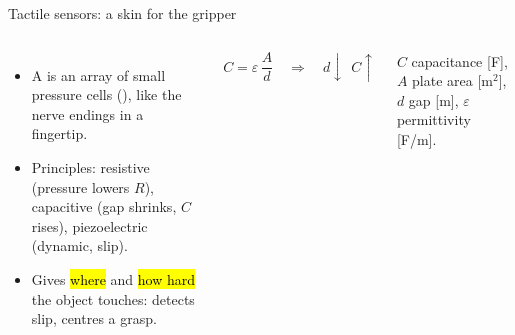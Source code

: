 \documentclass[aspectratio=169,10pt]{beamer}
\begin{document}
\begin{frame}{Tactile sensors: a skin for the gripper}
\begin{columns}[T]
\centering
{}
\begin{itemize}\small
\item A  is an array of small pressure cells (), like the nerve endings in a fingertip.
\item Principles: resistive (pressure lowers $R$), capacitive (gap shrinks, $C$ rises), piezoelectric (dynamic, slip).
\item Gives \hl{where} and \hl{how hard} the object touches: detects slip, centres a grasp.
\end{itemize}
\begin{eqbox}
\vspace{-2mm}
\[ C=\varepsilon\,\frac{A}{d}\quad\Rightarrow\quad d\downarrow\ \ C\uparrow \]
\vspace{-4mm}
\end{eqbox}
{\footnotesize $C$ capacitance [F], $A$ plate area [m$^2$], $d$ gap [m], $\varepsilon$ permittivity [F/m].}
\end{columns}
\end{frame}
\end{document}
